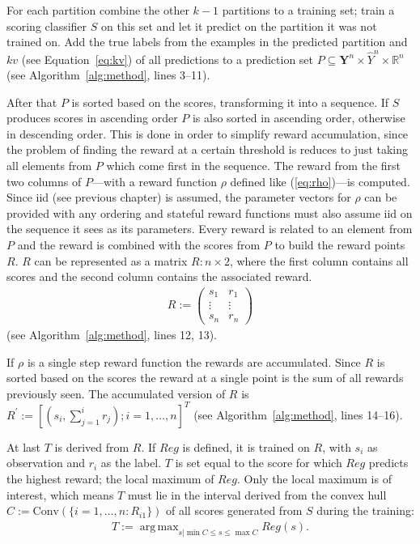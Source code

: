 \documentclass[twoside,11pt]{article}
\DeclareMathOperator*{\argmax}{arg\,max}
\def\Y{\textbf{Y}}
\begin{document}
For each partition combine the other $k-1$ partitions to a
training set; train a scoring classifier $S$ on this
set and let it predict on the partition it was not trained
on.
Add the true labels from the examples in the predicted
partition and $kv$ (see Equation~\ref{eq:kv}) of all
predictions to a prediction set
$P \subseteq \Y^n \times \hat{Y}^n \times \mathbb{R}^n$
(see Algorithm~\ref{alg:method}, lines 3--11).

After that $P$ is sorted based on the scores, transforming
it into a sequence.
If $S$ produces scores in ascending order $P$ is also
sorted in ascending order, otherwise in descending order.
This is done in order to simplify reward accumulation,
since the problem of finding the reward at a certain
threshold is reduces to just taking all elements from $P$
which come first in the sequence.
The reward from the first two columns of $P$---with a
reward function $\rho$ defined like (\ref{eq:rho})---is
computed.
Since iid (see previous chapter) is assumed, the parameter
vectors for $\rho$ can be provided with any ordering and
stateful reward functions must also assume iid on the
sequence it sees as its parameters.
Every reward is related to an element from $P$ and the
reward is combined with the scores from $P$ to build the
reward points $R$. $R$ can be represented as a matrix
$R: n \times 2$, where the first column contains all scores
and the second column contains the associated reward.
\begin{align*}
  R :=
    \begin{pmatrix}
      s_1 &r_1 \\
      \vdots &\vdots \\
      s_n &r_n
    \end{pmatrix}
\end{align*}
(see Algorithm~\ref{alg:method}, lines 12, 13).

If $\rho$ is a single step reward function the rewards
are accumulated.
Since $R$ is sorted based on the scores the reward at a
single point is the sum of all rewards previously seen.
The accumulated version of $R$ is
$R^\prime := [(s_i, \sum_{j=1}^{i} r_j); i=1,\dots,n]^T$
(see Algorithm~\ref{alg:method}, lines 14--16).

At last $T$ is derived from $R$. If $Reg$ is defined, it
is trained on $R$, with $s_i$ as observation and $r_i$ as
the label. $T$ is set equal to the score for which $Reg$
predicts the highest reward; the local maximum of $Reg$.
Only the local maximum is of interest, which means $T$
must lie in the interval derived from the convex hull
$C := \text{Conv}(\{i=1,\dots,n:R_{i1}\})$ of
all scores generated from $S$ during the training:
\begin{align}
  \label{eq:T_Reg}
  T := \argmax_{s | \min C \leq s \leq \max C} Reg(s).
\end{align}
\end{document}
